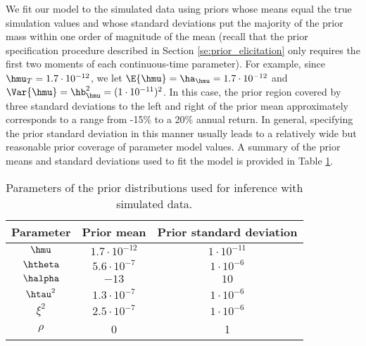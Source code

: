 We fit our model to the simulated data using priors whose means equal
the true simulation values and whose standard deviations put the
majority of the prior mass within one order of magnitude of the mean
(recall that the prior specification procedure described in Section
\ref{se:prior_elicitation} only requires the first two moments of each
continuous-time parameter). For example, since
$\hmu_T = 1.7 \cdot 10^{-12}$, we let
$\E{\hmu} = \ha_{\hmu} = 1.7 \cdot 10^{-12}$ and
$\Var{\hmu} = \hb_{\hmu}^2 = (1 \cdot 10^{-11})^2$. In this case, the
prior region covered by three standard deviations to the left and
right of the prior mean approximately corresponds to a range from
-15\% to a 20\% annual return.  In general, specifying the prior
standard deviation in this manner usually leads to a relatively wide
but reasonable prior coverage of parameter model values. A summary of
the prior means and standard deviations used to fit the model is
provided in Table \ref{ta:priors}.
\begin{table}[h]
\begin{center}
\begin{tabular}{c|c|c}
  Parameter & Prior mean & Prior standard deviation \\ \hline
  $\hmu$ & $1.7 \cdot 10^{-12}$ & $1 \cdot 10^{-11}$  \\
  $\htheta$ & $5.6 \cdot 10^{-7}$ & $1 \cdot 10^{-6}$  \\
  $\halpha$ & $-13$ & $10$  \\
  $\htau^2$ & $1.3\cdot 10^{-7}$ & $1\cdot 10^{-6}$  \\
  $\xi^2$ & $2.5 \cdot 10^{-7}$ & $1\cdot 10^{-6}$ \\
  $\rho$ & 0 & 1
\end{tabular}
\caption{Parameters of the prior distributions used for inference with simulated data.}\label{ta:priors}
\end{center}
\end{table}




